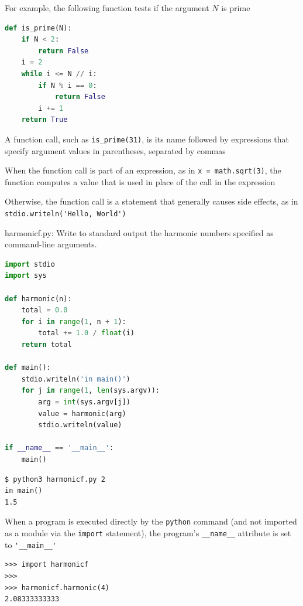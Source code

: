\documentclass[8pt,a4paper,compress]{beamer}
\begin{document}
\begin{frame}[fragile]
\pause

For example, the following function tests if the argument $N$ is prime

\begin{lstlisting}[language=Python]
def is_prime(N):
    if N < 2: 
        return False
    i = 2
    while i <= N // i:
        if N % i == 0:
            return False
        i += 1
    return True
\end{lstlisting}

\pause
\bigskip

A function call, such as \lstinline{is_prime(31)}, is its name followed by expressions that specify argument values in parentheses, separated by commas

\pause
\bigskip

When the function call is part of an expression, as in \lstinline{x = math.sqrt(3)}, the function computes a value that is used in place of the call in the expression

\pause
\bigskip

Otherwise, the function call is a statement that generally causes side effects, as in \lstinline{stdio.writeln('Hello, World')}
\end{frame}

\begin{frame}[fragile]
\pause

\begin{framed}
\tiny harmonicf.py:  Write to standard output the harmonic numbers specified as command-line arguments.
\end{framed}

\begin{lstlisting}[language=Python]
import stdio
import sys

def harmonic(n):
    total = 0.0
    for i in range(1, n + 1):
        total += 1.0 / float(i)
    return total

def main():
    stdio.writeln('in main()')
    for j in range(1, len(sys.argv)):
        arg = int(sys.argv[j])
        value = harmonic(arg)
        stdio.writeln(value)

if __name__ == '__main__':
    main()
\end{lstlisting}

\pause

\begin{lstlisting}[language={}]
$ python3 harmonicf.py 2
in main()
1.5
\end{lstlisting}

\pause
\bigskip

When a program is executed directly by the \lstinline{python} command (and not imported as a module via the \lstinline{import} statement), the program's \lstinline{__name__} attribute is set to \lstinline{'__main__'}

\begin{lstlisting}[language={}]
>>> import harmonicf
>>> 
>>> harmonicf.harmonic(4)
2.08333333333
\end{lstlisting}
\end{frame}
\end{document}
